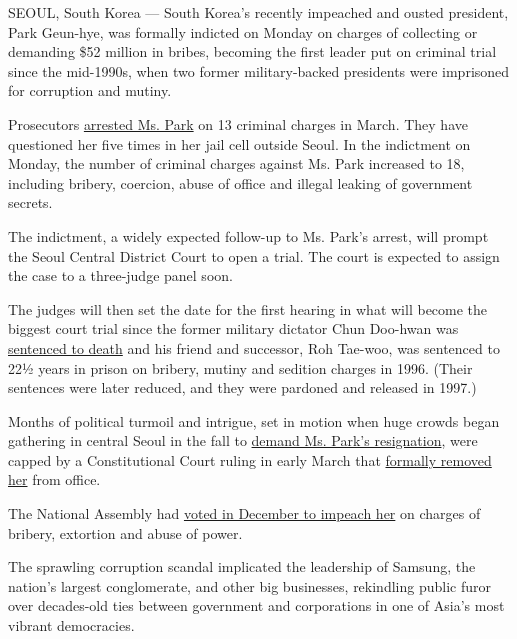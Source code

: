 SEOUL, South Korea --- South Korea's recently impeached and ousted
president, Park Geun-hye, was formally indicted on Monday on charges of
collecting or demanding \$52 million in bribes, becoming the first
leader put on criminal trial since the mid-1990s, when two former
military-backed presidents were imprisoned for corruption and mutiny.

Prosecutors
\href{https://www.nytimes.com/2017/03/30/world/asia/park-geun-hye-south-korea-arrest.html}{arrested
Ms. Park} on 13 criminal charges in March. They have questioned her five
times in her jail cell outside Seoul. In the indictment on Monday, the
number of criminal charges against Ms. Park increased to 18, including
bribery, coercion, abuse of office and illegal leaking of government
secrets.

The indictment, a widely expected follow-up to Ms. Park's arrest, will
prompt the Seoul Central District Court to open a trial. The court is
expected to assign the case to a three-judge panel soon.

The judges will then set the date for the first hearing in what will
become the biggest court trial since the former military dictator Chun
Doo-hwan was
\href{http://www.nytimes.com/1995/12/22/world/south-korea-indicts-2-former-presidents-in-staging-of-1979-coup.html}{sentenced
to death} and his friend and successor, Roh Tae-woo, was sentenced to
22½ years in prison on bribery, mutiny and sedition charges in 1996.
(Their sentences were later reduced, and they were pardoned and released
in 1997.)

Months of political turmoil and intrigue, set in motion when huge crowds
began gathering in central Seoul in the fall to
\href{https://www.nytimes.com/2016/11/26/world/asia/korea-park-geun-hye-protests.html}{demand
Ms. Park's resignation}, were capped by a Constitutional Court ruling in
early March that
\href{https://www.nytimes.com/2017/03/09/world/asia/park-geun-hye-impeached-south-korea.html}{formally
removed her} from office.

The National Assembly had
\href{https://www.nytimes.com/2016/12/09/world/asia/south-korea-president-park-geun-hye-impeached.html}{voted
in December to impeach her} on charges of bribery, extortion and abuse
of power.

The sprawling corruption scandal implicated the leadership of Samsung,
the nation's largest conglomerate, and other big businesses, rekindling
public furor over decades-old ties between government and corporations
in one of Asia's most vibrant democracies.

